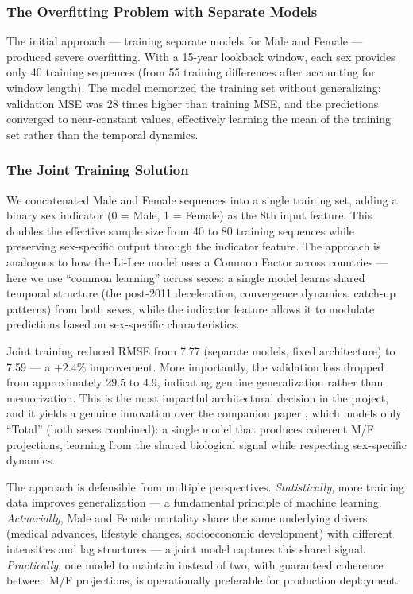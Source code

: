 \documentclass[11pt,a4paper]{article}
\begin{document}
\subsubsection{The Overfitting Problem with Separate Models}

The initial approach --- training separate models for Male and Female --- produced severe overfitting. With a 15-year lookback window, each sex provides only 40 training sequences (from 55 training differences after accounting for window length). The model memorized the training set without generalizing: validation MSE was 28 times higher than training MSE, and the predictions converged to near-constant values, effectively learning the mean of the training set rather than the temporal dynamics.

\subsubsection{The Joint Training Solution}

We concatenated Male and Female sequences into a single training set, adding a binary sex indicator (0 = Male, 1 = Female) as the 8th input feature. This doubles the effective sample size from 40 to 80 training sequences while preserving sex-specific output through the indicator feature. The approach is analogous to how the Li-Lee model uses a Common Factor across countries --- here we use ``common learning'' across sexes: a single model learns shared temporal structure (the post-2011 deceleration, convergence dynamics, catch-up patterns) from both sexes, while the indicator feature allows it to modulate predictions based on sex-specific characteristics.

Joint training reduced RMSE from 7.77 (separate models, fixed architecture) to 7.59 --- a $+2.4\%$ improvement. More importantly, the validation loss dropped from approximately 29.5 to 4.9, indicating genuine generalization rather than memorization. This is the most impactful architectural decision in the project, and it yields a genuine innovation over the companion paper \cite{rindori2026p04}, which models only ``Total'' (both sexes combined): a single model that produces coherent M/F projections, learning from the shared biological signal while respecting sex-specific dynamics.

The approach is defensible from multiple perspectives. \textit{Statistically}, more training data improves generalization --- a fundamental principle of machine learning. \textit{Actuarially}, Male and Female mortality share the same underlying drivers (medical advances, lifestyle changes, socioeconomic development) with different intensities and lag structures --- a joint model captures this shared signal. \textit{Practically}, one model to maintain instead of two, with guaranteed coherence between M/F projections, is operationally preferable for production deployment.
\end{document}
